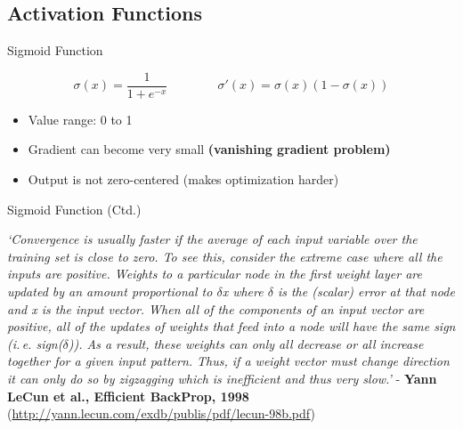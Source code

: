 \subsection{Activation Functions}

\begin{frame}{Sigmoid Function}{}
	\begin{boxBlueNoFrame}
		\begin{equation*}
			\sigma(x) = \frac{1}{1 + e^{-x}} \qquad\qquad
			\sigma'(x) = \sigma(x) (1 - \sigma(x))
		\end{equation*}
	\end{boxBlueNoFrame}

	\begin{itemize}
		\item Value range: 0 to 1
		\item {} Gradient can become very small \textbf{(vanishing gradient problem)}
		\item {} Output is not zero-centered (makes optimization harder)
	\end{itemize}
\end{frame}


\begin{frame}{Sigmoid Function (Ctd.)}{}
	\begin{boxBlueNoFrame}
		\footnotesize
		\textit{`Convergence is usually faster if the average of each input variable over the training set is close to zero.
		To see this, consider the extreme case where all the inputs are positive. Weights to a particular node in the first weight layer are updated by an amount
		proportional to $\delta$x where $\delta$ is the (scalar) error at that node and x is the input vector. When all of the components of an input vector are
		positive, all of the updates of weights that feed into a node will have the same sign (i.\,e. sign($\delta$)). As a result, these weights can only all decrease
		or all increase together for a given input pattern. Thus, if a weight vector must change direction it can only do so by zigzagging which is inefficient and thus
		very slow.'} - \textbf{Yann LeCun et al., Efficient BackProp, 1998} (\url{http://yann.lecun.com/exdb/publis/pdf/lecun-98b.pdf})
	\end{boxBlueNoFrame}
\end{frame}


